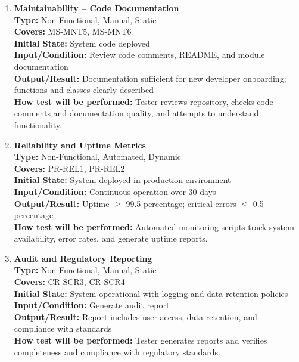 \documentclass[12pt, titlepage]{article}
\begin{document}
\begin{enumerate}[label=NFR-ST \arabic*., wide=0pt, leftmargin=*]
  \item \textbf{Maintainability – Code Documentation} \\[2mm]
    \textbf{Type:} Non-Functional, Manual, Static \\
    \textbf{Covers:} MS-MNT5, MS-MNT6 \\
    \textbf{Initial State:} System code deployed \\
    \textbf{Input/Condition:} Review code comments, README, and
    module documentation \\
    \textbf{Output/Result:} Documentation sufficient for new
    developer onboarding; functions and classes clearly described \\[2mm]
    \textbf{How test will be performed:} Tester reviews repository,
    checks code comments and documentation quality, and attempts to
    understand functionality.

  \item \textbf{Reliability and Uptime Metrics} \\[2mm]
    \textbf{Type:} Non-Functional, Automated, Dynamic \\
    \textbf{Covers:} PR-REL1, PR-REL2 \\
    \textbf{Initial State:} System deployed in production environment \\
    \textbf{Input/Condition:} Continuous operation over 30 days \\
    \textbf{Output/Result:} Uptime $\ge$ 99.5 percentage; critical errors $\le$ 0.5 percentage \\[2mm]
    \textbf{How test will be performed:} Automated monitoring scripts
    track system availability, error rates, and generate uptime reports.

  \item \textbf{Audit and Regulatory Reporting} \\[2mm]
    \textbf{Type:} Non-Functional, Manual, Static \\
    \textbf{Covers:} CR-SCR3, CR-SCR4 \\
    \textbf{Initial State:} System operational with logging and data
    retention policies \\
    \textbf{Input/Condition:} Generate audit report \\
    \textbf{Output/Result:} Report includes user access, data
    retention, and compliance with standards \\[2mm]
    \textbf{How test will be performed:} Tester generates reports and
    verifies completeness and compliance with regulatory standards.


\end{enumerate}
\end{document}
